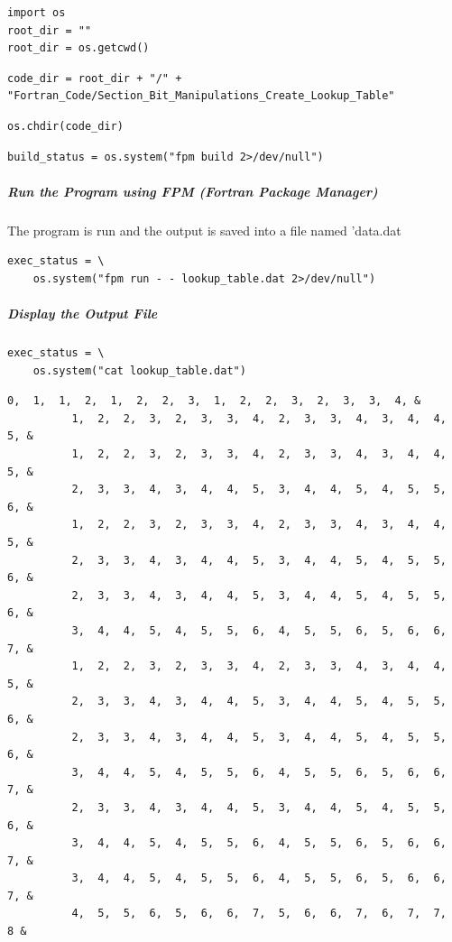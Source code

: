 \begin{verbatim}
import os
root_dir = ""
root_dir = os.getcwd()
\end{verbatim}

\begin{verbatim}
code_dir = root_dir + "/" + "Fortran_Code/Section_Bit_Manipulations_Create_Lookup_Table"
\end{verbatim}

\begin{verbatim}
os.chdir(code_dir)
\end{verbatim}

\begin{verbatim}
build_status = os.system("fpm build 2>/dev/null")
\end{verbatim}

\subparagraph{Run the Program using FPM (Fortran Package Manager)}

The program is run and the output is saved into a file named 'data.dat

\begin{verbatim}
exec_status = \
    os.system("fpm run - - lookup_table.dat 2>/dev/null")
\end{verbatim}

\subparagraph{Display the Output File}

\begin{verbatim}
exec_status = \
    os.system("cat lookup_table.dat")
\end{verbatim}

\begin{verbatim}
0,  1,  1,  2,  1,  2,  2,  3,  1,  2,  2,  3,  2,  3,  3,  4, &
          1,  2,  2,  3,  2,  3,  3,  4,  2,  3,  3,  4,  3,  4,  4,  5, &
          1,  2,  2,  3,  2,  3,  3,  4,  2,  3,  3,  4,  3,  4,  4,  5, &
          2,  3,  3,  4,  3,  4,  4,  5,  3,  4,  4,  5,  4,  5,  5,  6, &
          1,  2,  2,  3,  2,  3,  3,  4,  2,  3,  3,  4,  3,  4,  4,  5, &
          2,  3,  3,  4,  3,  4,  4,  5,  3,  4,  4,  5,  4,  5,  5,  6, &
          2,  3,  3,  4,  3,  4,  4,  5,  3,  4,  4,  5,  4,  5,  5,  6, &
          3,  4,  4,  5,  4,  5,  5,  6,  4,  5,  5,  6,  5,  6,  6,  7, &
          1,  2,  2,  3,  2,  3,  3,  4,  2,  3,  3,  4,  3,  4,  4,  5, &
          2,  3,  3,  4,  3,  4,  4,  5,  3,  4,  4,  5,  4,  5,  5,  6, &
          2,  3,  3,  4,  3,  4,  4,  5,  3,  4,  4,  5,  4,  5,  5,  6, &
          3,  4,  4,  5,  4,  5,  5,  6,  4,  5,  5,  6,  5,  6,  6,  7, &
          2,  3,  3,  4,  3,  4,  4,  5,  3,  4,  4,  5,  4,  5,  5,  6, &
          3,  4,  4,  5,  4,  5,  5,  6,  4,  5,  5,  6,  5,  6,  6,  7, &
          3,  4,  4,  5,  4,  5,  5,  6,  4,  5,  5,  6,  5,  6,  6,  7, &
          4,  5,  5,  6,  5,  6,  6,  7,  5,  6,  6,  7,  6,  7,  7,  8 &
\end{verbatim}
